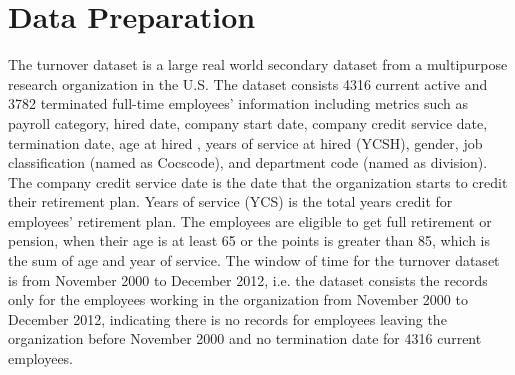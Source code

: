 \documentclass[12pt,letterpaper]{article}
\begin{document}
\section{Data Preparation}
The turnover dataset is a large real world secondary dataset from a multipurpose research organization in the U.S. The dataset consists 4316 current active and 3782 terminated full-time employees' information including metrics such as payroll category, hired date, company start date, company credit service date, termination date, age at hired , years of service at hired (YCSH), gender, job classification (named as Cocscode), and department code (named as division). The company credit service date is the date that the organization starts to credit their retirement plan. Years of service (YCS) is the total years credit for employees' retirement plan. The employees are eligible to get full retirement or pension, when their age is at least 65 or the points is greater than 85, which is the sum of age and year of service. The window of time for the turnover dataset is from November 2000 to December 2012, i.e. the dataset consists the records only for the employees working in the organization from November 2000 to December 2012, indicating there is no records for employees leaving the organization before November 2000 and no termination date for 4316 current employees. 
\end{document}
